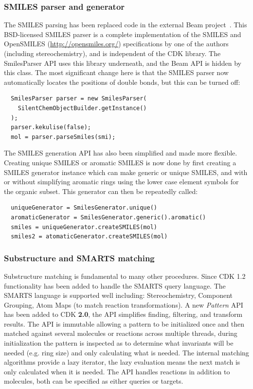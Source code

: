 \documentclass[10pt]{bmcart}
\def \cdkversion {\textbf{2.0}}
\begin{document}
  \subsubsection*{SMILES parser and generator}

  The SMILES parsing has been replaced code in the external Beam project~\cite{Beam}.
  This BSD-licensed SMILES parser is a complete implementation of the SMILES
  and OpenSMILES (\url{http://opensmiles.org/}) specifications by one of the
  authors (including stereochemistry), and is independent of
  the CDK library. The SmilesParser API uses this library underneath, and the
  Beam API is hidden by this class. The most significant change here is that
  the SMILES parser now automatically locates the positions of double bonds,
  but this can be turned off:

\begin{verbatim}
  SmilesParser parser = new SmilesParser(
    SilentChemObjectBuilder.getInstance()
  );
  parser.kekulise(false);
  mol = parser.parseSmiles(smi);
\end{verbatim}

  The SMILES generation API has also been simplified and made more flexible.
  Creating unique SMILES or aromatic SMILES is now done by first creating a
  SMILES generator instance which can make generic or unique SMILES, and with
  or without simplifying aromatic rings using the lower case element symbols
  for the organic subset. This generator can then be repeatedly called:

\begin{verbatim}
  uniqueGenerator = SmilesGenerator.unique()
  aromaticGenerator = SmilesGenerator.generic().aromatic()
  smiles = uniqueGenerator.createSMILES(mol)
  smiles2 = atomaticGenerator.createSMILES(mol)
\end{verbatim}

  \subsubsection*{Substructure and SMARTS matching}

  Substructure matching is fundamental to many other procedures. Since CDK 1.2 functionality has been added to handle the SMARTS query language. The SMARTS language is supported well including: Stereochemistry, Component Grouping, Atom Maps (to match reaction transformations). A new \textit{Pattern} API has been added to CDK \cdkversion{}, the API simplifies finding, filtering, and transform results. The API is immutable allowing a pattern to be initialized once and then matched against several molecules or reactions across multiple threads, during initialization the pattern is inspected as to determine what invariants will be needed (e.g. ring size) and only calculating what is needed. The internal matching algorithms provide a lazy iterator, the lazy evaluation means the next match is only calculated when it is needed. The API handles reactions in addition to molecules, both can be specified as either queries or targets.
\end{document}
